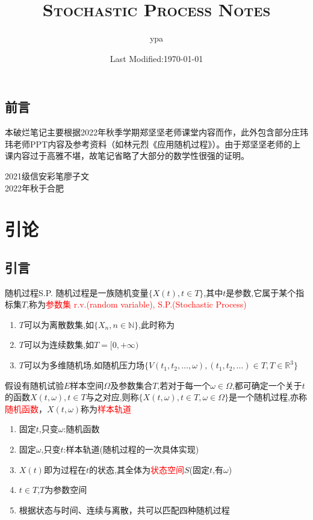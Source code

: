 \documentclass{elegantbook}
\title{\textsc{Stochastic Process Notes}}
\author{ypa}
\date{Last Modified:\today}
\begin{document}
\frontmatter
\section*{前言}
本破烂笔记主要根据2022年秋季学期郑坚坚老师课堂内容而作，此外包含部分庄玮玮老师PPT内容及参考资料（如林元烈《应用随机过程》）。由于郑坚坚老师的上课内容过于高雅不堪，故笔记省略了大部分的数学性很强的证明。
\begin{flushright}
    2021级信安彩笔廖子文\\
    2022年秋于合肥
\end{flushright}
\tableofcontents

\mainmatter
\chapter{引论}
\section{引言}
\begin{definition}{随机过程}{S.P.}
    随机过程是一族随机变量$\{X(t),t\in T\}$,其中$t$是参数,它属于某个指标集$T$,称为\textcolor{red}{参数集}
    \qquad \textcolor{red}{r.v.(random variable), S.P.(Stochastic Process)}
\end{definition}
\begin{remark}
    \begin{enumerate}
        \item $T$可以为离散数集,如$\{X_n,n\in \mathbb{N}\}$,此时称为
        \item $T$可以为连续数集,如$T=[0,+\infty)$
        \item $T$可以为多维随机场,如随机压力场$\{V(t_1,t_2,\dots ,\omega),(t_1,t_2,\dots )\in T,T\in \mathbb{R}^{3}\}$
    \end{enumerate}
\end{remark}

\begin{definition}{}{}
    假设有随机试验$E$样本空间$\Omega$及参数集合$T$,若对于每一个$\omega \in \Omega$,都可确定一个关于$t$的函数$X(t,\omega),t\in T$与之对应,则称$\{X(t,\omega),t\in T,\omega \in \Omega\}$是一个随机过程,亦称\textcolor{red}{随机函数}，$X(t,\omega)$称为\textcolor{red}{样本轨道}
\end{definition}
\begin{remark}
    \begin{enumerate}
        \item 固定$t$,只变$\omega$:随机函数
        \item 固定$\omega$,只变$t$:样本轨道(随机过程的一次具体实现)
        \item $X(t)$即为过程在$t$的状态,其全体为\textcolor{red}{状态空间}$S$(固定$t$,有$\omega$)
        \item $t\in T$,$T$为参数空间
        \item 根据状态与时间、连续与离散，共可以匹配四种随机过程
    \end{enumerate}
\end{remark}
\end{document}
